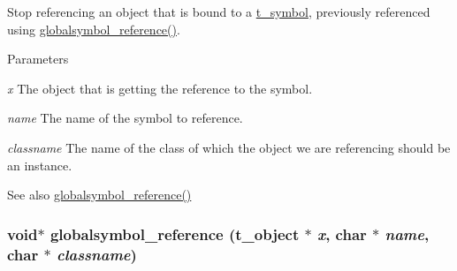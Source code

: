 Stop referencing an object that is bound to a \hyperlink{structt__symbol}{t\_\-symbol}, previously referenced using \hyperlink{group__misc_ga72a33738916b577d2df121edfea260b3}{globalsymbol\_\-reference()}. 
\begin{DoxyParams}{Parameters}
\item[{\em x}]The object that is getting the reference to the symbol. \item[{\em name}]The name of the symbol to reference. \item[{\em classname}]The name of the class of which the object we are referencing should be an instance. \end{DoxyParams}
\begin{DoxySeeAlso}{See also}
\hyperlink{group__misc_ga72a33738916b577d2df121edfea260b3}{globalsymbol\_\-reference()} 
\end{DoxySeeAlso}
\hypertarget{group__misc_ga72a33738916b577d2df121edfea260b3}{
\subsubsection[{globalsymbol\_\-reference}]{\setlength{\rightskip}{0pt plus 5cm}void$\ast$ globalsymbol\_\-reference ({\bf t\_\-object} $\ast$ {\em x}, \/  char $\ast$ {\em name}, \/  char $\ast$ {\em classname})}}
\label{group__misc_ga72a33738916b577d2df121edfea260b3}


